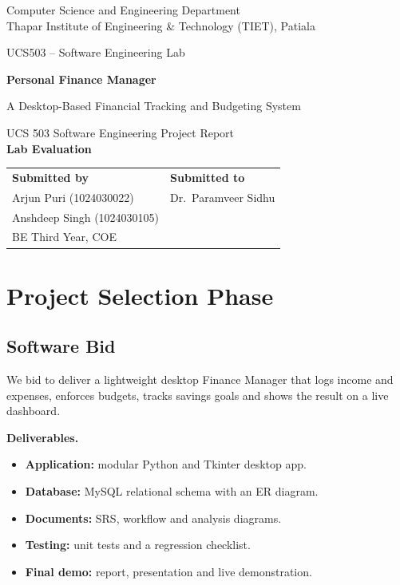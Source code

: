 \documentclass[12pt,a4paper]{article}
\begin{document}
\begin{titlepage}
  \centering
  \vspace*{1.5cm}
  {\large Computer Science and Engineering Department\\[2pt] Thapar Institute of Engineering \& Technology (TIET), Patiala\par}
  \vspace{2cm}
  {\large UCS503 -- Software Engineering Lab\par}
  \vspace{0.6cm}
  {\Huge\bfseries Personal Finance Manager\par}
  \vspace{0.5cm}
  {\Large A Desktop-Based Financial Tracking and Budgeting System\par}
  \vspace{0.8cm}
  {\large UCS 503 Software Engineering Project Report\\[4pt] \textbf{Lab Evaluation}\par}
  \vfill
  \begin{tabular}{@{}p{7cm}p{7cm}@{}}
    \textbf{Submitted by} & \textbf{Submitted to}\\[4pt]
    Arjun Puri (1024030022) & Dr.\ Paramveer Sidhu\\
    Anshdeep Singh (1024030105) & \\
    BE Third Year, COE & \\
  \end{tabular}
  \vspace{2cm}
\end{titlepage}

\tableofcontents
\clearpage
{}

\section{Project Selection Phase}

\subsection{Software Bid}
We bid to deliver a lightweight desktop Finance Manager that logs income and expenses, enforces budgets, tracks savings goals and shows the result on a live dashboard.

\textbf{Deliverables.}
\begin{itemize}
  \item \textbf{Application:} modular Python and Tkinter desktop app.
  \item \textbf{Database:} MySQL relational schema with an ER diagram.
  \item \textbf{Documents:} SRS, workflow and analysis diagrams.
  \item \textbf{Testing:} unit tests and a regression checklist.
  \item \textbf{Final demo:} report, presentation and live demonstration.
\end{itemize}
\end{document}
